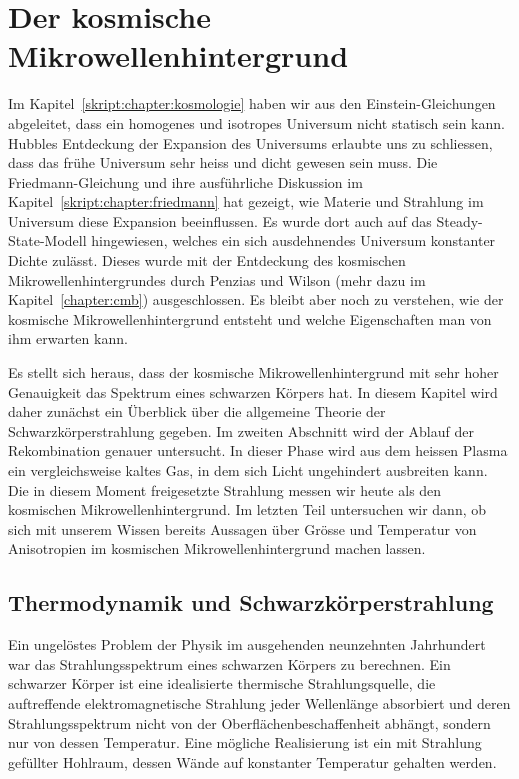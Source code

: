 %
%
%
\chapter{Der kosmische Mikrowellenhintergrund%
\label{skript:chapter:cmb}}
\rhead{}
Im Kapitel~\ref{skript:chapter:kosmologie} haben wir aus den
Einstein-Gleichungen abgeleitet, dass ein homogenes und isotropes
Universum nicht statisch sein kann.
Hubbles Entdeckung der Expansion des Universums erlaubte uns zu
schliessen, dass das frühe Universum sehr heiss und dicht gewesen
sein muss.
Die Friedmann-Gleichung und ihre ausführliche Diskussion im
Kapitel~\ref{skript:chapter:friedmann} hat gezeigt, wie Materie und
Strahlung im Universum diese Expansion beeinflussen.
Es wurde dort auch auf das Steady-State-Modell hingewiesen, welches
ein sich ausdehnendes Universum konstanter Dichte zulässt.
Dieses wurde mit der Entdeckung des kosmischen Mikrowellenhintergrundes durch
Penzias und Wilson (mehr dazu im Kapitel~\ref{chapter:cmb}) ausgeschlossen.
Es bleibt aber noch zu verstehen, wie der kosmische Mikrowellenhintergrund
entsteht und welche Eigenschaften man von ihm erwarten kann.

Es stellt sich heraus, dass der kosmische Mikrowellenhintergrund mit sehr
hoher Genauigkeit das Spektrum eines schwarzen Körpers hat.
In diesem Kapitel wird daher zunächst ein Überblick über die allgemeine
Theorie der Schwarzkörperstrahlung gegeben.
Im zweiten Abschnitt wird der Ablauf der Rekombination genauer untersucht.
In dieser Phase wird aus dem heissen Plasma ein vergleichsweise kaltes Gas,
in dem sich Licht ungehindert ausbreiten kann.
Die in diesem Moment freigesetzte Strahlung messen wir heute als den
kosmischen Mikrowellenhintergrund.
Im letzten Teil untersuchen wir dann, ob sich mit unserem Wissen
bereits Aussagen über Grösse und Temperatur von Anisotropien im kosmischen
Mikrowellenhintergrund machen lassen.

\section{Thermodynamik und Schwarzkörperstrahlung}
Ein ungelöstes Problem der Physik im ausgehenden neunzehnten Jahrhundert
war das Strahlungsspektrum eines schwarzen Körpers zu berechnen.
Ein schwarzer Körper ist eine idealisierte thermische Strahlungsquelle,
die auftreffende elektromagnetische Strahlung jeder Wellenlänge absorbiert
und deren Strahlungsspektrum nicht von der Oberflächenbeschaffenheit
abhängt, sondern nur von dessen Temperatur.
Eine mögliche Realisierung ist ein mit Strahlung gefüllter Hohlraum, dessen
Wände auf konstanter Temperatur gehalten werden.

